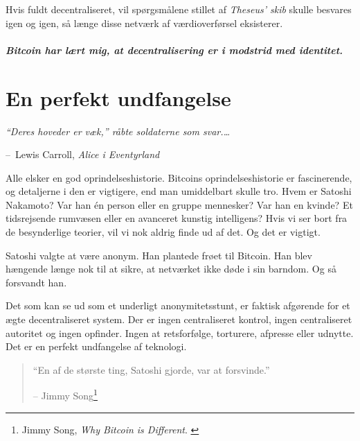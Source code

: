 \documentclass[paper=6in:9in,pagesize=pdftex,headinclude=on,footinclude=on,12pt]{scrbook}
\makeatletter
\newenvironment{chapquote}[2][4em]{\setlength{\@tempdima}{#1}%
   \def\chapquote@author{#2}%
   \parshape 1 \@tempdima \dimexpr\textwidth-2\@tempdima\relax%
   \itshape}{\par\normalfont\hfill--\ \chapquote@author\hspace*{\@tempdima}\par\bigskip}
\makeatother
\begin{document}
Hvis fuldt decentraliseret, vil spørgsmålene stillet af \textit{Theseus' skib} skulle besvares igen og igen, så længe disse netværk af værdioverførsel eksisterer.\paragraph{Bitcoin har lært mig, at decentralisering er i modstrid med identitet.}%
%
%
%
%

\chapter{En perfekt undfangelse}
\label{les:5}

\begin{chapquote}{Lewis Carroll, \textit{Alice i Eventyrland}} \enquote{Deres hoveder er væk,} råbte soldaterne som svar.\ldots
\end{chapquote}

Alle elsker en god oprindelseshistorie. Bitcoins oprindelseshistorie er fascinerende, og detaljerne i den er vigtigere, end man umiddelbart skulle tro. Hvem er Satoshi Nakamoto? Var han \'en person eller en gruppe mennesker? Var han en kvinde? Et tidsrejsende rumvæsen eller en avanceret kunstig intelligens? Hvis vi ser bort fra de besynderlige teorier, vil vi nok aldrig finde ud af det. Og det er vigtigt.

Satoshi valgte at være anonym. Han plantede frøet til Bitcoin. Han blev hængende længe nok til at sikre, at netværket ikke døde i sin barndom. Og så forsvandt han.

Det som kan se ud som et underligt anonymitetsstunt, er faktisk afgørende for et ægte decentraliseret system. Der er ingen centraliseret kontrol, ingen centraliseret autoritet og ingen opfinder. Ingen at retsforfølge, torturere, afpresse eller udnytte. Det er en perfekt undfangelse af teknologi.\begin{quotation}\begin{samepage} \enquote{En af de største ting, Satoshi gjorde, var at forsvinde.} \begin{flushright} -- Jimmy Song\footnote{Jimmy Song, \textit{Why Bitcoin is Different}. \cite{bitcoin-different}}
\end{flushright}\end{samepage}\end{quotation}
\end{document}
